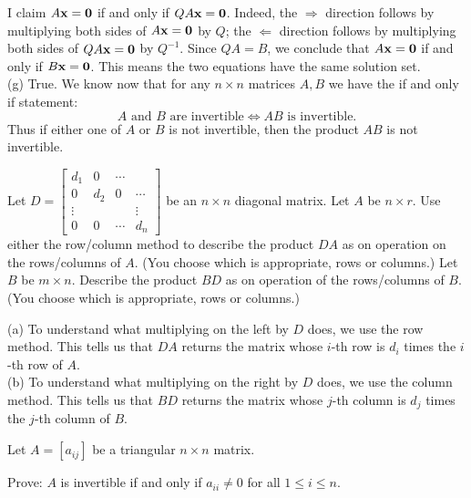 \begin{solution}
I claim $A{\mathbf x}={\mathbf 0}$ if and only if $QA{\mathbf x}={\mathbf 0}$. Indeed, the $\Rightarrow$ direction follows by multiplying both sides of $A{\mathbf x}={\mathbf 0}$ by $Q$; the $\Leftarrow$ direction follows by multiplying both sides of $QA{\mathbf x}={\mathbf 0}$ by $Q^{-1}$. Since $QA=B$, we conclude that $A{\mathbf x}={\mathbf 0}$ if and only if $B{\mathbf x}={\mathbf 0}$. This means the two equations have the same solution set. 
\\
(g) 
True.
We know now that for any $n\times n$ matrices $A,B$ we have the if and only if statement:
\[
A \text{ and } B \text{ are invertible}\Leftrightarrow AB \text{ is invertible.}
\]
Thus if either one of $A$ or $B$ is not invertible, then the product $AB$ is not invertible. 
\end{solution}
\ii \label{ex:diag} Let $D=\begin{bmatrix}d_1&0&\cdots\\ 0&d_2&0&\cdots\\ \vdots & & &\vdots\\ 0&0&\cdots & d_n \end{bmatrix}$ be an $n\times n$ diagonal matrix. 
\bb
\ii Let $A$ be $n\times r$. Use either the row/column method to describe the product $DA$ as on operation on the rows/columns of $A$. (You choose which is appropriate, rows or columns.) 
\ii Let $B$ be $m\times n$. Describe the product $BD$ as on operation of the rows/columns of $B$. (You choose which is appropriate, rows or columns.) 
\ee
\begin{solution}\noindent
(a) To understand what multiplying on the left by $D$ does, we use the row method. This tells us that $DA$ returns the matrix whose $i$-th row is $d_i$ times the $i$-th row of $A$. 
\\
(b) To understand what multiplying on the right by $D$ does, we use the column method. This tells us that $BD$ returns the matrix whose $j$-th column is $d_j$ times the $j$-th column of $B$. 
\end{solution}
\ii Let $A=[a_{ij}]$ be a triangular $n\times n$ matrix. 

Prove: $A$ is invertible if and only if $a_{ii}\ne 0$ for all $1\leq i\leq n$. 

